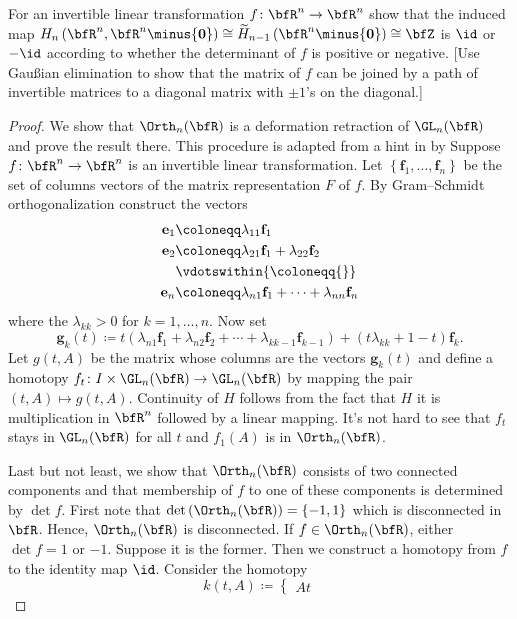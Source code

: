 \begin{problem}[Hatcher {\S}2.2, Ex.\@ 7]
For an invertible linear transformation $f\colon\bfR^n\to\bfR^n$ show that
the induced map
$H_n\left(\bfR^n,\bfR^n\minus\{\mathbf{0}\}\right)\cong\widetilde
H_{n-1}\left(\bfR^n\minus\{\mathbf{0}\}\right)\cong\bfZ$ is $\id$ or $-\id$
according to whether the determinant of $f$ is positive or negative. [Use
Gaußian elimination to show that the matrix of $f$ can be joined by a path
of invertible matrices to a diagonal matrix with $\pm 1$'s on the
diagonal.]
\end{problem}
\begin{proof}
We show that $\Orth_n(\bfR)$ is a deformation retraction of $\GL_n(\bfR)$
and prove the result there. This procedure is adapted from a hint in
\emph{} by  Suppose $f\colon\bfR^n\to\bfR^n$ is
an invertible linear transformation. Let
$\left\{\mathbf{f}_1,...,\mathbf{f}_n\right\}$ be the set of columns
vectors of the matrix representation $F$ of $f$. By Gram--Schmidt
orthogonalization construct the vectors
\begin{equation}
\label{eq:gram-schmidt-orth}
\begin{aligned}
\mathbf{e}_1&\coloneqq\lambda_{11}\mathbf{f}_1\\
\mathbf{e}_2&\coloneqq\lambda_{21}\mathbf{f}_1+\lambda_{22}\mathbf{f}_2\\
&\vdotswithin{{}\coloneqq{}}\\
\mathbf{e}_n&\coloneqq\lambda_{n1}\mathbf{f}_1+\cdots+\lambda_{nn}\mathbf{f}_n
\end{aligned}
\end{equation}
where the $\lambda_{kk}>0$ for $k=1,...,n$. Now set
\begin{equation}
\label{eq:vectors-as-function-of-t}
\mathbf{g}_k(t)\coloneqq
t\left(\lambda_{n1}\mathbf{f}_1+\lambda_{n2}\mathbf{f}_2+\cdots+\lambda_{kk-1}\mathbf{f}_{k-1}\right)+(t\lambda_{kk}+1-t)\mathbf{f}_k.
\end{equation}
Let $g(t,A)$ be the matrix whose columns are the vectors $\mathbf{g}_k(t)$
and define a homotopy $f_t\colon I\times\GL_n(\bfR)\to\GL_n(\bfR)$ by mapping
the pair $(t,A)\mapsto g(t,A)$. Continuity of $H$ follows from the fact
that $H$ it is multiplication in $\bfR^n$ followed by a linear
mapping. It's not hard to see that $f_t$ stays in $\GL_n(\bfR)$ for all $t$
and $f_1(A)$ is in $\Orth_n(\bfR)$.

Last but not least, we show that $\Orth_n(\bfR)$ consists of two connected
components and that membership of $f$ to one of these components is
determined by $\det f$. First note that
$\det\left(\Orth_n(\bfR)\right)=\{-1,1\}$ which is disconnected in
$\bfR$. Hence, $\Orth_n(\bfR)$ is disconnected. If $f\in\Orth_n(\bfR)$,
either $\det f=1$ or $-1$. Suppose it is the former. Then we construct a
homotopy from $f$ to the identity map $\id$. Consider the homotopy
\begin{equation}
  \label{eq:homotopy}
k(t,A)\coloneqq
\begin{cases}
At
\end{cases}
\end{equation}
\end{proof}
\newpage

